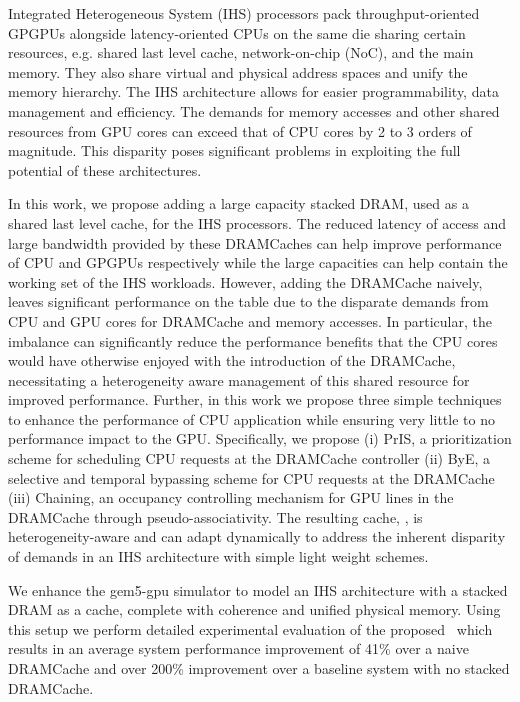 \par Integrated Heterogeneous System (IHS) processors pack throughput-oriented GPGPUs alongside latency-oriented CPUs on the same die sharing certain resources, e.g. shared last level cache, network-on-chip (NoC), and the main memory. They also share virtual and physical address spaces and unify the memory hierarchy. The IHS architecture allows for easier programmability, data management and efficiency. The demands for memory accesses and other shared resources from GPU cores can exceed that of CPU cores by 2 to 3 orders of magnitude. This disparity poses significant problems in exploiting the full potential of these architectures.
\par In this work, we propose adding a large capacity stacked DRAM, used as a shared last level cache, for the IHS processors. The reduced latency of access and large bandwidth provided by these DRAMCaches can help improve performance of CPU and GPGPUs respectively while the large capacities can help contain the working set of the IHS workloads. However, adding the DRAMCache naively, leaves significant performance on the table due to the disparate demands from CPU and GPU cores for DRAMCache and memory accesses. In particular, the imbalance can significantly reduce the performance benefits that the CPU cores would have otherwise enjoyed with the introduction of the DRAMCache, necessitating a heterogeneity aware management of this shared resource for improved performance. Further, in this work we propose three simple techniques to enhance the performance of CPU application while ensuring very little to no performance impact to the GPU. Specifically, we propose (i) PrIS, a prioritization scheme for scheduling CPU
requests at the DRAMCache controller (ii) ByE, a selective and temporal bypassing scheme for CPU requests at the DRAMCache (iii) Chaining, an occupancy controlling mechanism for GPU lines in the DRAMCache through pseudo-associativity. The resulting cache, \cachename, is heterogeneity-aware and can adapt dynamically to address the inherent disparity of demands in an IHS architecture with simple light weight schemes. 
\par We enhance the gem5-gpu simulator to model an IHS architecture with a stacked DRAM as a cache, complete with coherence and unified physical memory. Using this setup we perform detailed experimental evaluation of the proposed \cachename\ which results in an average system performance improvement of 41\% over a naive DRAMCache and over 200\% improvement over a baseline system with no stacked DRAMCache.

